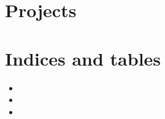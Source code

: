 \documentclass[letterpaper,10pt,english]{sphinxmanual}
\begin{document}
\chapter{Projects}
\label{\detokenize{Projects/Projects:projects}}\label{\detokenize{Projects/Projects::doc}}

\chapter{Indices and tables}
\label{\detokenize{index:indices-and-tables}}\begin{itemize}
\item {} 
\sphinxAtStartPar
{}

\item {} 
\sphinxAtStartPar
{}

\item {} 
\sphinxAtStartPar
{}

\end{itemize}



\renewcommand{\indexname}{Index}
\printindex
\end{document}
